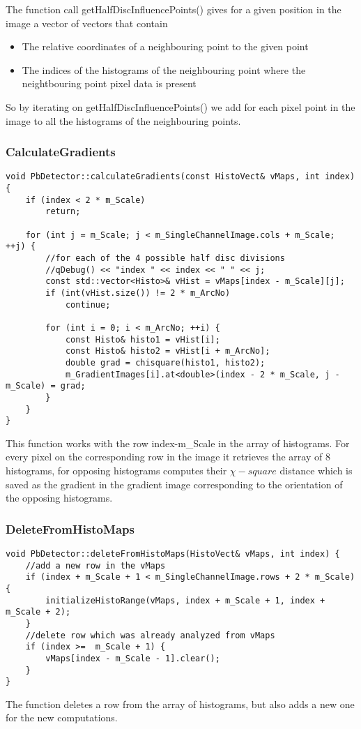 The function call getHalfDiscInfluencePoints() gives for a given position in the image a vector of vectors that contain
\begin{itemize}
	\item The relative coordinates of a neighbouring point to the given point
	\item The indices of the histograms of the neighbouring point where the neightbouring point pixel data is present
\end{itemize}

So by iterating on getHalfDiscInfluencePoints() we add for each pixel point in the image to all the histograms of the neighbouring points.

\subsubsection{CalculateGradients}

\begin{lstlisting}
void PbDetector::calculateGradients(const HistoVect& vMaps, int index) {
	if (index < 2 * m_Scale)
		return;
	
	for (int j = m_Scale; j < m_SingleChannelImage.cols + m_Scale; ++j) {
		//for each of the 4 possible half disc divisions
		//qDebug() << "index " << index << " " << j;
		const std::vector<Histo>& vHist = vMaps[index - m_Scale][j];
		if (int(vHist.size()) != 2 * m_ArcNo)
			continue;
		
		for (int i = 0; i < m_ArcNo; ++i) {
			const Histo& histo1 = vHist[i];
			const Histo& histo2 = vHist[i + m_ArcNo];
			double grad = chisquare(histo1, histo2);
			m_GradientImages[i].at<double>(index - 2 * m_Scale, j - m_Scale) = grad;
		}
	}
}
\end{lstlisting}

This function works with the row index-m\_Scale in the array of histograms. For every pixel on the corresponding row in the image it retrieves the array of 8 histograms, for opposing histograms computes their $\chi -square$ distance which is saved as the gradient in the gradient image corresponding to the orientation of the opposing histograms.

\subsubsection{DeleteFromHistoMaps}

\begin{lstlisting}
void PbDetector::deleteFromHistoMaps(HistoVect& vMaps, int index) {
	//add a new row in the vMaps
	if (index + m_Scale + 1 < m_SingleChannelImage.rows + 2 * m_Scale) {
		initializeHistoRange(vMaps, index + m_Scale + 1, index + m_Scale + 2);
	}
	//delete row which was already analyzed from vMaps
	if (index >=  m_Scale + 1) {
		vMaps[index - m_Scale - 1].clear();
	}
}
\end{lstlisting}

The function deletes a row from the array of histograms, but also adds a new one for the new computations.